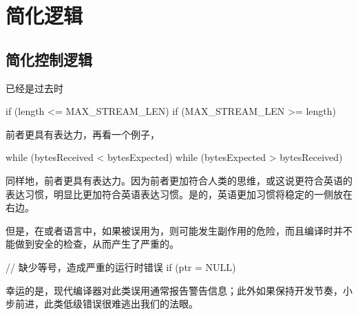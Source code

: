 \begin{savequote}[45mm]
\end{savequote}

\chapter{简化逻辑}
\label{ch:simple-logic}

\section{简化控制逻辑}

\begin{content}

\begin{regulation}
已经是过去时
\end{regulation}

\begin{leftbar}
\begin{c++}
if (length <= MAX_STREAM_LEN)
if (MAX_STREAM_LEN >= length)
\end{c++}
\end{leftbar}

前者更具有表达力，再看一个例子，

\begin{leftbar}
\begin{c++}
while (bytesReceived < bytesExpected)
while (bytesExpected > bytesReceived)
\end{c++}
\end{leftbar}

同样地，前者更具有表达力。因为前者更加符合人类的思维，或这说更符合英语的表达习惯，明显比更加符合英语表达习惯。是的，英语更加习惯将稳定的一侧放在右边。

但是，在\clang{}或者\cpp{}语言中，如果\ascii{==}被误用为\ascii{=}，则可能发生副作用的危险，而且编译时并不能做到安全的检查，从而产生了严重的。

\begin{leftbar}
\begin{c++}
// 缺少等号，造成严重的运行时错误
if (ptr = NULL)
\end{c++}
\end{leftbar}

幸运的是，现代编译器对此类误用通常报告警告信息；此外如果保持开发节奏，小步前进，此类低级错误很难逃出我们的法眼。


\end{content}
